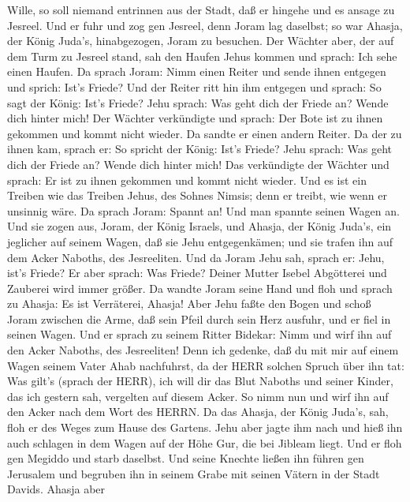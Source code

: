 Wille, so soll niemand entrinnen aus der Stadt, daß er hingehe und es
ansage zu Jesreel.  Und er fuhr und zog gen Jesreel, denn
Joram lag daselbst; so war Ahasja, der König Juda's, hinabgezogen, Joram
zu besuchen.  Der Wächter aber, der auf dem Turm zu Jesreel
stand, sah den Haufen Jehus kommen und sprach: Ich sehe einen Haufen. Da
sprach Joram: Nimm einen Reiter und sende ihnen entgegen und sprich:
Ist's Friede?  Und der Reiter ritt hin ihm entgegen und
sprach: So sagt der König: Ist's Friede? Jehu sprach: Was geht dich der
Friede an? Wende dich hinter mich! Der Wächter verkündigte und sprach:
Der Bote ist zu ihnen gekommen und kommt nicht wieder.  Da
sandte er einen andern Reiter. Da der zu ihnen kam, sprach er: So
spricht der König: Ist's Friede? Jehu sprach: Was geht dich der Friede
an? Wende dich hinter mich!  Das verkündigte der Wächter
und sprach: Er ist zu ihnen gekommen und kommt nicht wieder. Und es ist
ein Treiben wie das Treiben Jehus, des Sohnes Nimsis; denn er treibt,
wie wenn er unsinnig wäre.  Da sprach Joram: Spannt an! Und
man spannte seinen Wagen an. Und sie zogen aus, Joram, der König
Israels, und Ahasja, der König Juda's, ein jeglicher auf seinem Wagen,
daß sie Jehu entgegenkämen; und sie trafen ihn auf dem Acker Naboths,
des Jesreeliten.  Und da Joram Jehu sah, sprach er: Jehu,
ist's Friede? Er aber sprach: Was Friede? Deiner Mutter Isebel
Abgötterei und Zauberei wird immer größer.  Da wandte Joram
seine Hand und floh und sprach zu Ahasja: Es ist Verräterei, Ahasja!
 Aber Jehu faßte den Bogen und schoß Joram zwischen die
Arme, daß sein Pfeil durch sein Herz ausfuhr, und er fiel in seinen
Wagen.  Und er sprach zu seinem Ritter Bidekar: Nimm und
wirf ihn auf den Acker Naboths, des Jesreeliten! Denn ich gedenke, daß
du mit mir auf einem Wagen seinem Vater Ahab nachfuhrst, da der HERR
solchen Spruch über ihn tat:  Was gilt's (sprach der HERR),
ich will dir das Blut Naboths und seiner Kinder, das ich gestern sah,
vergelten auf diesem Acker. So nimm nun und wirf ihn auf den Acker nach
dem Wort des HERRN.  Da das Ahasja, der König Juda's, sah,
floh er des Weges zum Hause des Gartens. Jehu aber jagte ihm nach und
hieß ihn auch schlagen in dem Wagen auf der Höhe Gur, die bei Jibleam
liegt. Und er floh gen Megiddo und starb daselbst.  Und
seine Knechte ließen ihn führen gen Jerusalem und begruben ihn in seinem
Grabe mit seinen Vätern in der Stadt Davids.  Ahasja aber
